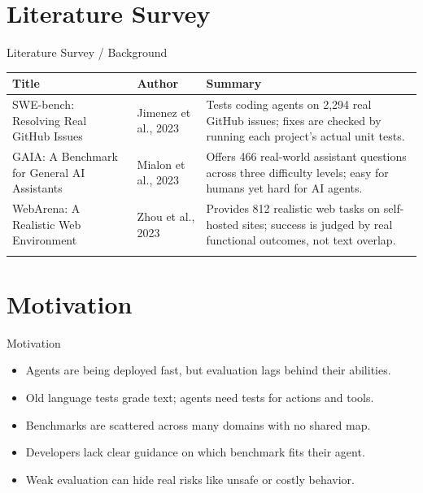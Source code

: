 \documentclass[10pt]{beamer}
\begin{document}
\section{Literature Survey}
\begin{frame}{Literature Survey / Background}
  \small
  \begin{tabular}{@{}p{2.7cm}p{2.3cm}p{5.6cm}@{}}
    \toprule
    \textbf{Title} & \textbf{Author} & \textbf{Summary} \\
    \midrule
    SWE-bench: Resolving Real GitHub Issues & Jimenez et al., 2023 & Tests coding agents on 2,294 real GitHub issues; fixes are checked by running each project's actual unit tests. \\
    \addlinespace
    GAIA: A Benchmark for General AI Assistants & Mialon et al., 2023 & Offers 466 real-world assistant questions across three difficulty levels; easy for humans yet hard for AI agents. \\
    \addlinespace
    WebArena: A Realistic Web Environment & Zhou et al., 2023 & Provides 812 realistic web tasks on self-hosted sites; success is judged by real functional outcomes, not text overlap. \\
    \addlinespace
    \bottomrule
  \end{tabular}
\end{frame}
\section{Motivation}
\begin{frame}{Motivation}
\begin{itemize}
  \item Agents are being deployed fast, but evaluation lags behind their abilities.
  \item Old language tests grade text; agents need tests for actions and tools.
  \item Benchmarks are scattered across many domains with no shared map.
  \item Developers lack clear guidance on which benchmark fits their agent.
  \item Weak evaluation can hide real risks like unsafe or costly behavior.
\end{itemize}
\end{frame}
\end{document}
